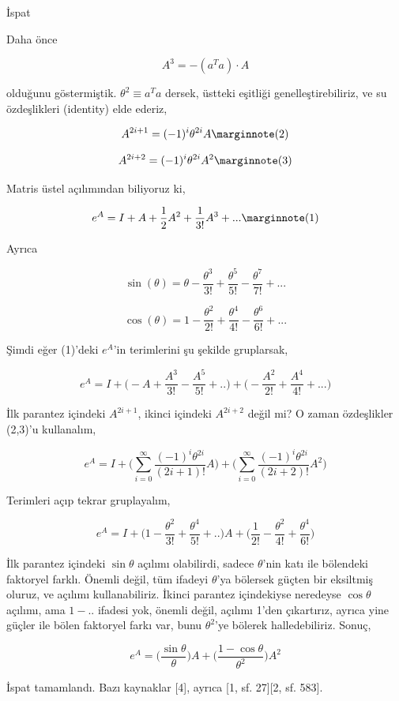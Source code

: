 \documentclass[12pt,fleqn]{article}\usepackage{../../common}
\begin{document}
İspat

Daha önce

$$ A^3 = -(a^Ta) \cdot A $$

olduğunu göstermiştik. $\theta^2 \equiv a^Ta$ dersek, üstteki eşitliği
genelleştirebiliriz, ve su özdeşlikleri (identity) elde ederiz,

$$ 
A^{2i+1} = (-1)^i \theta^{2i} A 
\mlabel{2} 
$$

$$ 
A^{2i+2} = (-1)^i \theta^{2i} A^2 
\mlabel{3} 
$$

Matris üstel açılımından biliyoruz ki,

$$ e^{A} =  I + A + \frac{1}{2}A^2 + \frac{1}{3!}A^3 + ...
\mlabel{1}
$$

Ayrıca

$$ \sin(\theta) = \theta - \frac{\theta^3}{3!} + \frac{\theta^5}{5!} - \frac{\theta^7}{7!} + ...$$

$$ \cos(\theta) = 1 - \frac{\theta^2}{2!} + \frac{\theta^4}{4!} - \frac{\theta^6}{6!} + ... $$

Şimdi eğer (1)'deki $e^A$'in terimlerini şu şekilde gruplarsak,

$$ e^A = I 
+ \bigg( - A + \frac{A^3}{3!} - \frac{A^5}{5!} + .. \bigg) 
+ \bigg( - \frac{A^2}{2!} + \frac{A^4}{4!} + ...  \bigg)  
$$

İlk parantez içindeki $A^{2i+1}$, ikinci içindeki $A^{2i+2}$ değil mi?
O zaman özdeşlikler (2,3)'u kullanalım,

$$ e^A = I 
+ \bigg( \sum _{i=0}^{\infty} \frac{(-1)^i \theta^{2i}}{(2i+1)!} A\bigg) 
+ \bigg( \sum _{i=0}^{\infty} \frac{(-1)^i \theta^{2i}}{(2i+2)!} A^2\bigg) 
$$

Terimleri açıp tekrar gruplayalım,

$$ e^A = I 
+ \bigg( 1 - \frac{\theta^2}{3!} + \frac{\theta^4}{5!} + .. \bigg) A
+ \bigg( \frac{1}{2!} - \frac{\theta^2}{4!} + \frac{\theta^4}{6!} \bigg)  
$$

İlk parantez içindeki $\sin \theta$ açılımı olabilirdi, sadece $\theta$'nin
katı ile bölendeki faktoryel farklı. Önemli değil, tüm ifadeyi $\theta$'ya
bölersek güçten bir eksiltmiş oluruz, ve açılımı kullanabiliriz. İkinci
parantez içindekiyse neredeyse $\cos \theta$ açılımı, ama $1 - ..$ ifadesi
yok, önemli değil, açılımı 1'den çıkartırız, ayrıca yine güçler ile bölen
faktoryel farkı var, bunu $\theta^2$'ye bölerek halledebiliriz. Sonuç, 

$$ e^A = \bigg( \frac{\sin \theta}{\theta} \bigg) A + 
\bigg( \frac{1-\cos \theta}{\theta^2} \bigg) A^2
$$

İspat tamamlandı. Bazı kaynaklar [4], ayrıca [1, sf. 27][2, sf. 583]. 
\end{document}

